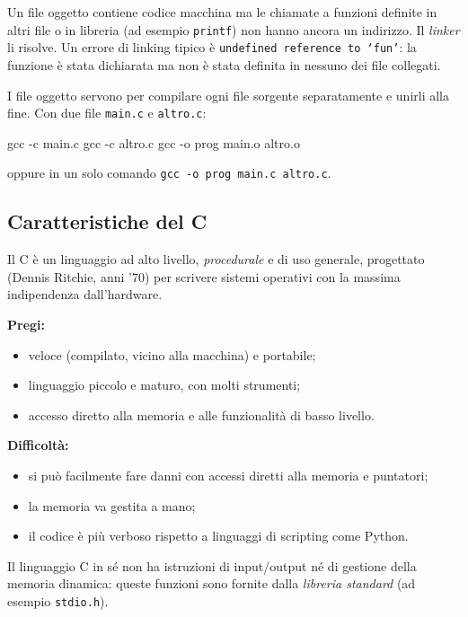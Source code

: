 \documentclass[11pt,a4paper]{article}
\begin{document}
\begin{osservazione}
Un file oggetto contiene codice macchina ma le chiamate a funzioni definite in
altri file o in libreria (ad esempio \lstinline|printf|) non hanno ancora un
indirizzo. Il \emph{linker} li risolve. Un errore di linking tipico è
\texttt{undefined reference to `fun'}: la funzione è stata dichiarata ma non
è stata definita in nessuno dei file collegati.
\end{osservazione}

I file oggetto servono per compilare ogni file sorgente separatamente e unirli
alla fine. Con due file \texttt{main.c} e \texttt{altro.c}:
\begin{comando}
gcc -c main.c
gcc -c altro.c
gcc -o prog main.o altro.o
\end{comando}
oppure in un solo comando \lstinline|gcc -o prog main.c altro.c|.

\subsection{Caratteristiche del C}

Il C è un linguaggio ad alto livello, \emph{procedurale} e di uso generale,
progettato (Dennis Ritchie, anni '70) per scrivere sistemi operativi con la
massima indipendenza dall'hardware.

\textbf{Pregi:}
\begin{itemize}
    \item veloce (compilato, vicino alla macchina) e portabile;
    \item linguaggio piccolo e maturo, con molti strumenti;
    \item accesso diretto alla memoria e alle funzionalità di basso livello.
\end{itemize}

\textbf{Difficoltà:}
\begin{itemize}
    \item si può facilmente fare danni con accessi diretti alla memoria e
          puntatori;
    \item la memoria va gestita a mano;
    \item il codice è più verboso rispetto a linguaggi di scripting come Python.
\end{itemize}

\begin{osservazione}
Il linguaggio C in sé non ha istruzioni di input/output né di gestione della
memoria dinamica: queste funzioni sono fornite dalla \emph{libreria standard}
(ad esempio \lstinline|stdio.h|).
\end{osservazione}
\end{document}
